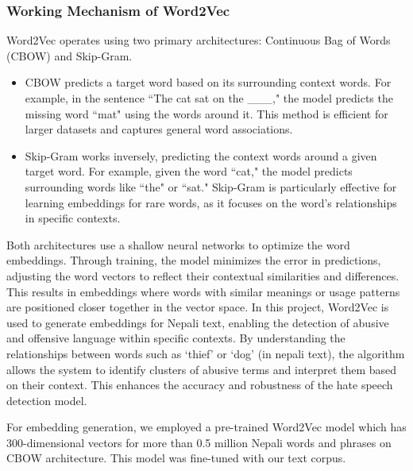 \subsubsection{Working Mechanism of Word2Vec}
Word2Vec operates using two primary architectures: Continuous Bag of Words (CBOW) and Skip-Gram.
\begin{itemize}
\item CBOW predicts a target word based on its surrounding context words. For example, in the sentence ``The cat sat on the \_\_\_," the model predicts the missing word ``mat" using the words around it. This method is efficient for larger datasets and captures general word associations.
\item Skip-Gram works inversely, predicting the context words around a given target word. For example, given the word ``cat," the model predicts surrounding words like ``the" or ``sat." Skip-Gram is particularly effective for learning embeddings for rare words, as it focuses on the word's relationships in specific contexts.
\end{itemize}

Both architectures use a shallow neural networks to optimize the word embeddings. Through training, the model minimizes the error in predictions, adjusting the word vectors to reflect their contextual similarities and differences. This results in embeddings where words with similar meanings or usage patterns are positioned closer together in the vector space.
In this project, Word2Vec is used to generate embeddings for Nepali text, enabling the detection of abusive and offensive language within specific contexts. By understanding the relationships between words such as `thief' or `dog' (in nepali text), the algorithm allows the system to identify clusters of abusive terms and interpret them based on their context. This enhances the accuracy and robustness of the hate speech detection model.

For embedding generation, we employed a pre-trained Word2Vec model which has 300-dimensional vectors for more than 0.5 million Nepali words and phrases \cite{dz6s-my90-19} on CBOW architecture. This model was fine-tuned with our text corpus.
